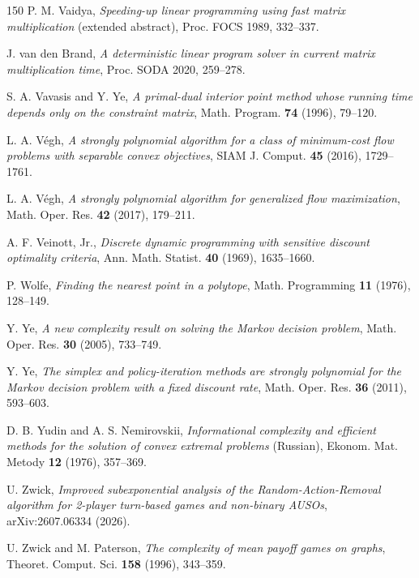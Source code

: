 \begin{thebibliography}{150}
P. M. Vaidya, \emph{Speeding-up linear programming using fast matrix multiplication} (extended abstract), Proc. FOCS 1989, 332--337.

J. van den Brand, \emph{A deterministic linear program solver in current matrix multiplication time}, Proc. SODA 2020, 259--278.

S. A. Vavasis and Y. Ye, \emph{A primal-dual interior point method whose running time depends only on the constraint matrix}, Math. Program. \textbf{74} (1996), 79--120.

L. A. V\'egh, \emph{A strongly polynomial algorithm for a class of minimum-cost flow problems with separable convex objectives}, SIAM J. Comput. \textbf{45} (2016), 1729--1761.

L. A. V\'egh, \emph{A strongly polynomial algorithm for generalized flow maximization}, Math. Oper. Res. \textbf{42} (2017), 179--211.

A. F. Veinott, Jr., \emph{Discrete dynamic programming with sensitive discount optimality criteria}, Ann. Math. Statist. \textbf{40} (1969), 1635--1660.

P. Wolfe, \emph{Finding the nearest point in a polytope}, Math. Programming \textbf{11} (1976), 128--149.

Y. Ye, \emph{A new complexity result on solving the Markov decision problem}, Math. Oper. Res. \textbf{30} (2005), 733--749.

Y. Ye, \emph{The simplex and policy-iteration methods are strongly polynomial for the Markov decision problem with a fixed discount rate}, Math. Oper. Res. \textbf{36} (2011), 593--603.

D. B. Yudin and A. S. Nemirovskii, \emph{Informational complexity and efficient methods for the solution of convex extremal problems} (Russian), Ekonom. Mat. Metody \textbf{12} (1976), 357--369.

U. Zwick, \emph{Improved subexponential analysis of the Random-Action-Removal algorithm for 2-player turn-based games and non-binary AUSOs}, arXiv:2607.06334 (2026).

U. Zwick and M. Paterson, \emph{The complexity of mean payoff games on graphs}, Theoret. Comput. Sci. \textbf{158} (1996), 343--359.

\end{thebibliography}
